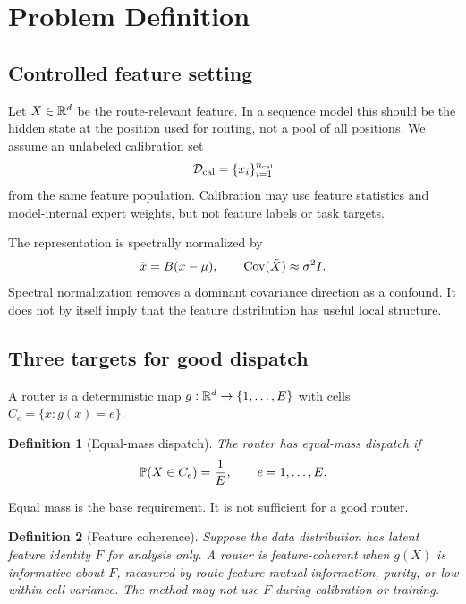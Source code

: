 \documentclass{article}
\newtheorem{definition}{Definition}
\begin{document}
\section{Problem Definition}

\subsection{Controlled feature setting}

Let $X\in\mathbb{R}^d$ be the route-relevant feature.  In a sequence model this should be
the hidden state at the position used for routing, not a pool of all positions.
We assume an unlabeled calibration set
\begin{equation}
  \mathcal{D}_{\mathrm{cal}}=\{x_i\}_{i=1}^{n_{\mathrm{cal}}}
\end{equation}
from the same feature population.  Calibration may use feature statistics and
model-internal expert weights, but not feature labels or task targets.

The representation is spectrally normalized by
\begin{equation}
  \tilde x = B(x-\mu),\qquad \mathrm{Cov}(\tilde X)\approx \sigma^2 I.
\end{equation}
Spectral normalization removes a dominant covariance direction as a confound.  It
does not by itself imply that the feature distribution has useful local
structure.

\subsection{Three targets for good dispatch}

A router is a deterministic map $g:\mathbb{R}^d\rightarrow\{1,\ldots,E\}$ with cells
$C_e=\{x:g(x)=e\}$.

\begin{definition}[Equal-mass dispatch]
The router has equal-mass dispatch if
\begin{equation}
  \mathbb{P}(X\in C_e)=\frac{1}{E},\qquad e=1,\ldots,E.
\end{equation}
\end{definition}

Equal mass is the base requirement.  It is not sufficient for a good router.

\begin{definition}[Feature coherence]
Suppose the data distribution has latent feature identity $F$ for analysis only.
A router is feature-coherent when $g(X)$ is informative about $F$, measured by
route-feature mutual information, purity, or low within-cell variance.  The
method may not use $F$ during calibration or training.
\end{definition}
\end{document}
